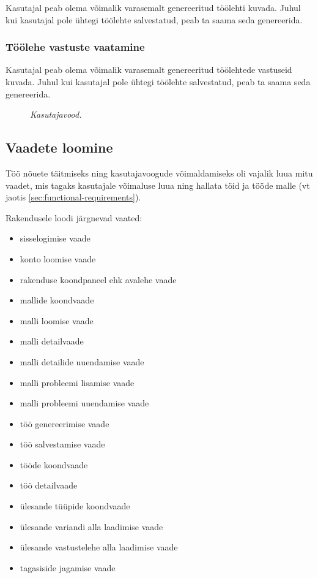 Kasutajal peab olema võimalik varasemalt genereeritud töölehti kuvada. Juhul kui kasutajal pole ühtegi töölehte salvestatud, peab ta saama seda genereerida.

\subsubsection{Töölehe vastuste vaatamine}

Kasutajal peab olema võimalik varasemalt genereeritud töölehtede vastuseid kuvada. Juhul kui kasutajal pole ühtegi töölehte salvestatud, peab ta saama seda genereerida.

\begin{figure}
\begin{adjustbox}{width=\textwidth}

\end{adjustbox}
\caption{\emph{Kasutajavood.}}\label{fig:userflow}
\end{figure}

\subsection{Vaadete loomine}

Töö nõuete täitmiseks ning kasutajavoogude võimaldamiseks oli vajalik luua mitu vaadet, mis tagaks kasutajale võimaluse luua ning hallata töid ja tööde malle (vt jaotis \ref{sec:functional-requirements}).

Rakendusele loodi järgnevad vaated:
\begin{itemize}
  \item sisselogimise vaade
  \item konto loomise vaade
  \item rakenduse koondpaneel ehk avalehe vaade
  \item mallide koondvaade
  \item malli loomise vaade
  \item malli detailvaade
  \item malli detailide uuendamise vaade
  \item malli probleemi lisamise vaade
  \item malli probleemi uuendamise vaade
  \item töö genereerimise vaade
  \item töö salvestamise vaade
  \item tööde koondvaade
  \item töö detailvaade
  \item ülesande tüüpide koondvaade
  \item ülesande variandi alla laadimise vaade
  \item ülesande vastustelehe alla laadimise vaade
  \item tagasiside jagamise vaade
\end{itemize}

